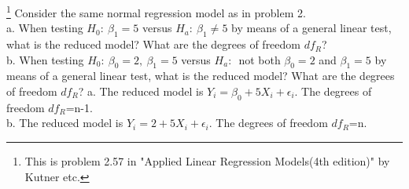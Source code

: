 \documentclass[12pt]{article}
\begin{document}
 {\footnote[3]{This is
problem 2.57 in "Applied Linear Regression Models(4th edition)" by
Kutner etc.} 
 Consider the same normal regression model as in problem 2.\\
 a. When testing $H_0:~\beta_1=5$ versus $H_a:~\beta_1\ne 5$ by means of a general linear test, what is the reduced model? What are the degrees of freedom $df_R$?\\
 b. When testing $H_0:~ \beta_0=2,~\beta_1=5$ versus $H_a:$~not both $\beta_0=2$ and $\beta_1=5$ by means of a general linear test, what is the reduced model? What are the degrees of freedom $df_R$? 
}
 { \vfill
  \answer
} {
a. The reduced model is $Y_i=\beta_0+5X_i+\epsilon_i$. The degrees of freedom $df_R$=n-1.\\
b. The reduced model is $Y_i=2+5X_i+\epsilon_i$. The degrees of freedom $df_R$=n.\\
}



\problemsdone
\end{document}
